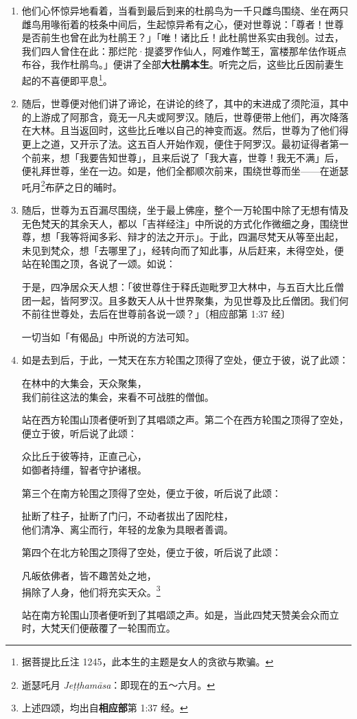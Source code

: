 \begin{enumerate}
\item 他们心怀惊异地看着，当看到最后到来的杜鹃鸟为一千只雌鸟围绕、坐在两只雌鸟用喙衔着的枝条中间后，生起惊异希有之心，便对世尊说：「尊者！世尊是否前生也曾在此为杜鹃王？」「唯！诸比丘！此杜鹃世系实由我创。过去，我们四人曾住在此：那烂陀·提婆罗作仙人，阿难作鹫王，富楼那牟佉作斑点布谷，我作杜鹃鸟。」便讲了全部\textbf{大杜鹃本生}。听完之后，这些比丘因前妻生起的不喜便即平息\footnote{据菩提比丘注 1245，此本生的主题是女人的贪欲与欺骗。}。
\item 随后，世尊便对他们讲了谛论，在讲论的终了，其中的末进成了须陀洹，其中的上游成了阿那含，竟无一凡夫或阿罗汉。随后，世尊便带上他们，再次降落在大林。且当返回时，这些比丘唯以自己的神变而返。然后，世尊为了他们得更上之道，又开示了法。这五百人开始作观，便住于阿罗汉。最初证得者第一个前来，想「我要告知世尊」，且来后说了「我大喜，世尊！我无不满」后，便礼拜世尊，坐在一边。如是，他们全都顺次前来，围绕世尊而坐——在逝瑟吒月\footnote{逝瑟吒月 \textit{Jeṭṭhamāsa}：即现在的五～六月。}布萨之日的晡时。
\item 随后，世尊为五百漏尽围绕，坐于最上佛座，整个一万轮围中除了无想有情及无色梵天的其余天人，都以「吉祥经注」中所说的方式化作微细之身，围绕世尊，想「我等将闻多彩、辩才的法之开示」。于此，四漏尽梵天从等至出起，未见到梵众，想「去哪里了」，经转向而了知此事，从后赶来，未得空处，便站在轮围之顶，各说了一颂。如说：\begin{quoting}于是，四净居众天人想：「彼世尊住于释氏迦毗罗卫大林中，与五百大比丘僧团一起，皆阿罗汉。且多数天人从十世界聚集，为见世尊及比丘僧团。我们何不前往世尊处，去后在世尊前各说一颂？」{\bluefootnotesize 〔相应部第 1:37 经〕}\end{quoting}一切当如「有偈品」中所说的方法可知。
\item 如是去到后，于此，一梵天在东方轮围之顶得了空处，便立于彼，说了此颂：\begin{quoting}在林中的大集会，天众聚集，\\我们前往这法的集会，来看不可战胜的僧伽。\end{quoting}站在西方轮围山顶者便听到了其唱颂之声。第二个在西方轮围之顶得了空处，便立于彼，听后说了此颂：\begin{quoting}众比丘于彼等持，正直己心，\\如御者持缰，智者守护诸根。\end{quoting}第三个在南方轮围之顶得了空处，便立于彼，听后说了此颂：\begin{quoting}扯断了柱子，扯断了门闩，不动者拔出了因陀柱，\\他们清净、离尘而行，年轻的龙象为具眼者善调。\end{quoting}第四个在北方轮围之顶得了空处，便立于彼，听后说了此颂：\begin{quoting}凡皈依佛者，皆不趣苦处之地，\\捐除了人身，他们将充实天众。\footnote{上述四颂，均出自\textbf{相应部}第 1:37 经。}\end{quoting}站在南方轮围山顶者便听到了其唱颂之声。如是，当此四梵天赞美会众而立时，大梵天们便蔽覆了一轮围而立。

\end{enumerate}
